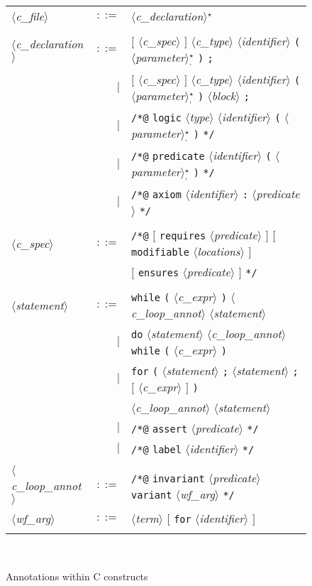 \documentclass[a4paper,12pt]{report}
\makeatletter
\newcommand{\te}[1]{\texttt{#1}}
\newcommand{\nt}[1]{$\langle$\textsl{#1}$\rangle$}
\newcommand{\indextt}[1]{\index{#1@\texttt{#1}}}
\newcommand{\etoile}{$^{\star}$}
\newcommand{\etoilesep}[1]{$^{\star}_#1$}
\makeatother
\begin{document}
\begin{figure}[htbp]
\begin{center}
\hrulefill\\
\begin{tabular}{lrl}
  \nt{c\_file}
    & $::=$ & \nt{c\_declaration}\etoile\ \\
  \\[0.1em]

  \nt{c\_declaration}
    & $::=$ & $[$ \nt{c\_spec} $]$ \nt{c\_type} \nt{identifier} \te{(} 
              \nt{parameter}\etoilesep{\te{,}} \te{)} 
              \te{;} \\
      & $|$ & $[$ \nt{c\_spec} $]$ \nt{c\_type} \nt{identifier} \te{(} 
              \nt{parameter}\etoilesep{\te{,}} \te{)} 
              \nt{block} \te{;} \\
      & $|$ & \te{/*@} \te{logic} \nt{type} \nt{identifier} \te{(} 
              \nt{parameter}\etoilesep{\te{,}} \te{)} \te{*/} \\
      & $|$ & \te{/*@} \te{predicate} \nt{identifier} \te{(} 
              \nt{parameter}\etoilesep{\te{,}} \te{)} \te{*/} \\
      & $|$ & \te{/*@} \te{axiom} \nt{identifier} \te{:} 
              \nt{predicate} \te{*/} \\
  \\[0.1em]

  \nt{c\_spec}
    & $::=$ & \te{/*@} $[$ \te{requires} \nt{predicate} $]$ 
              $[$ \te{modifiable} \nt{locations} $]$\\
           && $[$ \te{ensures} \nt{predicate} $]$ \te{*/}  \\
  \\[0.1em]

  \nt{statement}
    & $::=$ & \te{while} \te{(} \nt{c\_expr} \te{)}
              \nt{c\_loop\_annot} \nt{statement} \\
    &   $|$ & \te{do} \nt{statement} \nt{c\_loop\_annot} 
              \te{while} \te{(} \nt{c\_expr} \te{)} \\
    &   $|$ & \te{for} \te{(} \nt{statement} \te{;} \nt{statement} \te{;}
              $[$ \nt{c\_expr} $]$ \te{)} \\
           && \nt{c\_loop\_annot} \nt{statement} \\
    &   $|$ & \te{/*@} \te{assert} \nt{predicate} \te{*/} \\ \indextt{assert}
    &   $|$ & \te{/*@} \te{label} \nt{identifier} \te{*/} \\ \indextt{label}
  \\[0.1em]

  \nt{c\_loop\_annot}
    & $::=$ & \te{/*@} \te{invariant} \nt{predicate} 
              \te{variant} \nt{wf\_arg} \te{*/}  \\
  \nt{wf\_arg} 
    & $::=$ & \nt{term} $[$ \te{for} \nt{identifier} $]$ \\

  \\[0.1em]
\end{tabular}\\
\hrulefill
\caption{Annotations within C constructs}
\label{fig:cfiles}
\end{center}           
\end{figure}
\end{document}
